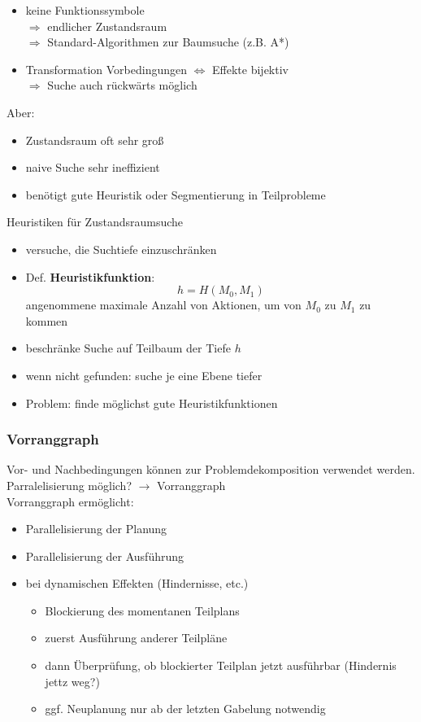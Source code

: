 \begin{itemize}
\item keine Funktionssymbole \\ $\Rightarrow$ endlicher Zustandsraum \\ $\Rightarrow$ Standard-Algorithmen zur Baumsuche (z.B. A*)
\item Transformation Vorbedingungen $\Leftrightarrow$ Effekte bijektiv \\ $\Rightarrow$ Suche auch rückwärts möglich
\end{itemize}
Aber:
\begin{itemize}
\item Zustandsraum oft sehr groß
\item naive Suche sehr ineffizient
\item benötigt gute Heuristik oder Segmentierung in Teilprobleme
\end{itemize}
Heuristiken für Zustandsraumsuche
\begin{itemize}
\item versuche, die Suchtiefe einzuschränken
\item Def. \textbf{Heuristikfunktion}: $$h = H(M_0,M_1)$$ angenommene maximale Anzahl von Aktionen, um von $M_0$ zu $M_1$ zu kommen
\item beschränke Suche auf Teilbaum der Tiefe $h$
\item wenn nicht gefunden: suche je eine Ebene tiefer
\item Problem: finde möglichst gute Heuristikfunktionen
\end{itemize}
\subsubsection*{Vorranggraph}
Vor- und Nachbedingungen können zur Problemdekomposition verwendet werden. Parralelisierung möglich? $\to$ Vorranggraph \\
Vorranggraph ermöglicht:
\begin{itemize}
\item Parallelisierung der Planung
\item Parallelisierung der Ausführung
\item bei dynamischen Effekten (Hindernisse, etc.)
\begin{itemize}
\item Blockierung des momentanen Teilplans
\item zuerst Ausführung anderer Teilpläne
\item dann Überprüfung, ob blockierter Teilplan jetzt ausführbar (Hindernis jettz weg?)
\item ggf. Neuplanung nur ab der letzten Gabelung notwendig
\end{itemize}
\end{itemize}

